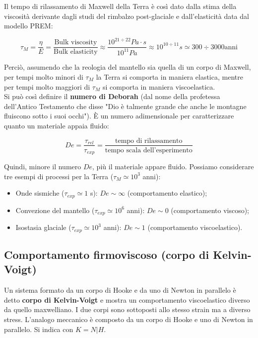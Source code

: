 \documentclass[a4paper,12pt]{book}
\begin{document}
\noindent
Il tempo di rilassamento di Maxwell della Terra è così dato dalla stima della viscosità derivante dagli studi del rimbalzo post-glaciale e dall'elasticità data dal modello PREM:

\begin{equation}
    \tau_M = \frac{\eta}{E} = \frac{\text{Bulk viscosity}}{\text{Bulk elasticity}} \approx \frac{10^{21 \div 22} Pa \cdot s}{10^{11} Pa} \approx 10^{10 \div 11} s \simeq 300 \div 3000 \text{anni}
\end{equation}

\noindent Perciò, assumendo che la reologia del mantello sia quella di un corpo di Maxwell, per tempi molto minori di $\tau_M$ la Terra si comporta in maniera elastica, mentre per tempi molto maggiori di $\tau_M$ si comporta in maniera viscoelastica.\\

\noindent
Si può così definire il \textbf{numero di Deborah} (dal nome della profetessa dell'Antico Testamento che disse "Dio è talmente grande che anche le montagne fluiscono sotto i suoi occhi").
È un numero adimensionale per caratterizzare quanto un materiale appaia fluido:

\begin{equation}
    De = \frac{\tau_{rel}}{\tau_{exp}} = \frac{\text{tempo di rilassamento}}{\text{tempo scala dell'esperimento}}
    \label{eq:deborah}
\end{equation}

\noindent
Quindi, minore il numero $De$, più il materiale appare fluido. Possiamo considerare tre esempi di processi per la Terra ($\tau_M \simeq 10^3$ anni):

\begin{itemize}
    \item Onde sismiche ($\tau_{exp} \simeq 1$ s): $De \sim \infty$ (comportamento elastico);
    \item Convezione del mantello ($\tau_{exp} \simeq 10^6$ anni): $De \sim 0$ (comportamento viscoso);
    \item Isostasia glaciale ($\tau_{exp} \simeq 10^3$ anni): $De \sim 1$ (comportamento viscoelastico).
\end{itemize}

\subsection{\textcolor{colore7}{Comportamento firmoviscoso (corpo di Kelvin-Voigt)}}

Un sistema formato da un corpo di Hooke e da uno di Newton in parallelo è detto \textbf{corpo di Kelvin-Voigt} e mostra un comportamento viscoelastico diverso da quello maxwelliano.
I due corpi sono sottoposti allo stesso strain ma a diverso stress.
L'analogo meccanico è composto da un corpo di Hooke e uno di Newton in parallelo. Si indica con $K = N|H$.
\end{document}
